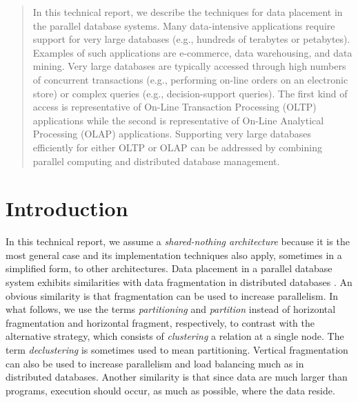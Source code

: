 \documentclass{vldb}
\begin{document}


\maketitle

\begin{abstract}
In this technical report, we describe the techniques for data placement in the parallel database systems. Many data-intensive applications require support for very large databases (e.g., hundreds of terabytes or petabytes).
Examples of such applications are e-commerce, data warehousing, and data mining. Very large databases are typically accessed through high numbers of concurrent transactions (e.g., performing on-line orders on an electronic store) or complex queries (e.g., decision-support queries). The first kind of access is representative of On-Line Transaction Processing (OLTP) applications while the second is representative of On-Line Analytical Processing (OLAP) applications. Supporting very large databases efficiently for either OLTP or OLAP can be addressed by combining parallel computing and distributed database management.
\end{abstract}


\section{Introduction}
In this technical report, we assume a \textit{shared-nothing architecture} because it is the most general case and its implementation techniques also apply, sometimes in a simplified form, to other architectures. Data placement in a parallel database system exhibits similarities with data fragmentation in distributed databases \cite{zsu:2011}. An obvious similarity is that fragmentation can be used to increase parallelism. 
In what follows, we use the terms \textit{partitioning} and \textit{partition} instead of horizontal fragmentation and horizontal fragment, respectively, to contrast with the alternative strategy, which consists of \textit{clustering} a relation at a single node. 
The term \textit{declustering} is sometimes used to mean partitioning. 
Vertical fragmentation can also be used to increase parallelism and load balancing much as in distributed databases. Another similarity is that since data are much larger than programs, execution should occur, as much as possible, where the data reside. 
\end{document}
